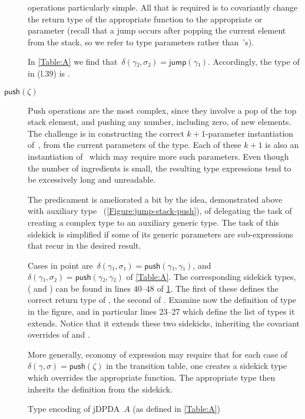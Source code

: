 \begin{description}
  operations particularly simple.
  All that is required is to covariantly change the return type of the
  appropriate  function to the appropriate  or~ parameter
  (recall that a jump occurs after popping the current element from the stack, so
  we refer to  type parameters rather than~'s).
  \par
  In \cref{Table:A} we find that~$δ(γ₂,σ₂) =\textsf{jump}(γ₁)$. Accordingly, the type of 
  in  (l.39) is .
  \item[$\textsf{push}(\zeta)$]
  Push operations are the most complex, since they involve a pop of the top stack element,
  and pushing any number, including zero, of new elements.
  The challenge is in constructing the correct $k+1$-parameter instantiation of~,
  from the current parameters of the type.
  Each of these $k+1$ is also an instantiation of~ which may require more such
  parameters.
  Even though the number of ingredients is small, the resulting type expressions
  tend to be excessively long and unreadable.
  \par
  The predicament is ameliorated a bit by the idea,
  demonstrated above with auxiliary type~
  (\cref{Figure:jump-stack-push}),
  of delegating the task of creating a complex type to an auxiliary
  generic type.
  The task of this sidekick is simplified if some of its generic
  parameters are sub-expressions that recur in the desired
  result.
  \par
  Cases in point
  are~$δ(γ₁,σ₁)=\textsf{push}(γ₁,γ₁)$, and~$δ(γ₁,σ₂)=\textsf{push}(γ₂,γ₂)$ of \cref{Table:A}.
  The corresponding sidekick types,
  ( and )
  can be found in lines 40--48 of \cref{Figure:A}.
  The first of these defines the correct return type
  of , the second of .
  Examine now the definition of type  in the figure,
  and in particular lines 23--27 which define the list of types it extends.
  Notice that it extends these two sidekicks, inheriting the covariant
  overrides of  and .
  \par
  More generally, economy of expression may require that for each case
    of~$δ(γ,σ)=\textsf{push}(\zeta)$ in the transition table,
    one creates a sidekick type which
      overrides the appropriate  function.
  The appropriate  type then inherits the definition
    from the sidekick.
\end{description}

\begin{figure}[htbp]
  \caption{\label{Figure:A}Type encoding of jDPDA~$A$ (as defined in \cref{Table:A})}
\end{figure}
